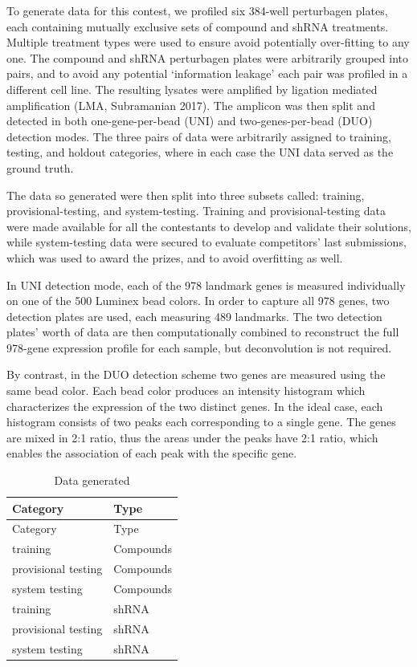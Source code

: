 \documentclass[]{article}
\begin{document}
To generate data for this contest, we profiled six 384-well perturbagen
plates, each containing mutually exclusive sets of compound and shRNA
treatments. Multiple treatment types were used to ensure avoid
potentially over-fitting to any one. The compound and shRNA perturbagen
plates were arbitrarily grouped into pairs, and to avoid any potential
`information leakage' each pair was profiled in a different cell line.
The resulting lysates were amplified by ligation mediated amplification
(LMA, Subramanian 2017). The amplicon was then split and detected in
both one-gene-per-bead (UNI) and two-genes-per-bead (DUO) detection
modes. The three pairs of data were arbitrarily assigned to training,
testing, and holdout categories, where in each case the UNI data served
as the ground truth.

The data so generated were then split into three subsets called:
training, provisional-testing, and system-testing. Training and
provisional-testing data were made available for all the contestants to
develop and validate their solutions, while system-testing data were
secured to evaluate competitors' last submissions, which was used to
award the prizes, and to avoid overfitting as well.

In UNI detection mode, each of the 978 landmark genes is measured
individually on one of the 500 Luminex bead colors. In order to capture
all 978 genes, two detection plates are used, each measuring 489
landmarks. The two detection plates' worth of data are then
computationally combined to reconstruct the full 978-gene expression
profile for each sample, but deconvolution is not required.

By contrast, in the DUO detection scheme two genes are measured using
the same bead color. Each bead color produces an intensity histogram
which characterizes the expression of the two distinct genes. In the
ideal case, each histogram consists of two peaks each corresponding to a
single gene. The genes are mixed in 2:1 ratio, thus the areas under the
peaks have 2:1 ratio, which enables the association of each peak with
the specific gene.

\begin{longtable}[]{@{}ll@{}}
\caption{Data generated}\tabularnewline
\toprule
Category & Type\tabularnewline
\midrule
\endfirsthead
\toprule
Category & Type\tabularnewline
\midrule
\endhead
training & Compounds\tabularnewline
provisional testing & Compounds\tabularnewline
system testing & Compounds\tabularnewline
training & shRNA\tabularnewline
provisional testing & shRNA\tabularnewline
system testing & shRNA\tabularnewline
\bottomrule
\end{longtable}
\end{document}
